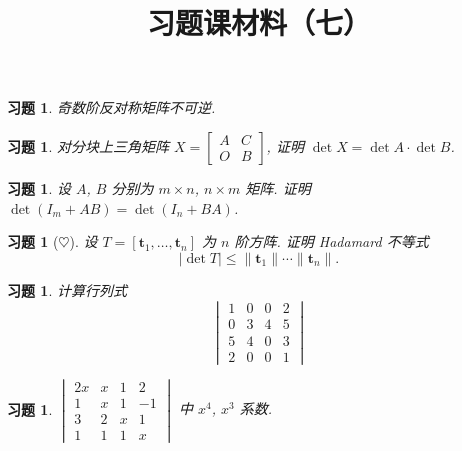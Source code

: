 \documentclass[UTF8]{ctexart}
\newtheorem{ex}[thm]{习题}
\begin{document}
\title{习题课材料（七）}
\date{}

\maketitle



\begin{ex}
  奇数阶反对称矩阵不可逆.
\end{ex}


\begin{ex}
  对分块上三角矩阵 \(X=\begin{bmatrix}A & C \\ O & B\end{bmatrix}\),
  证明 \(\det X = \det A \cdot \det B\).
\end{ex}


\begin{ex}
  设 \(A\), \(B\) 分别为 \(m\times n\), \(n\times m\) 矩阵.
  证明 \(\det(I_m + AB) = \det(I_n+BA)\).
\end{ex}

 

\begin{ex}[\(\heartsuit\)]
  设 \(T = [\boldsymbol{t}_1,\ldots,\boldsymbol{t}_n]\) 为 \(n\) 阶方阵.
  证明 Hadamard 不等式
  \[
    |\det T| \leq \|\boldsymbol{t}_1\| \cdots \|\boldsymbol{t}_n\|.
  \]
\end{ex}




\begin{ex}
  计算行列式
  \begin{equation*}
    \begin{vmatrix}
      1 & 0 & 0 & 2 \\
      0 & 3 & 4 & 5 \\
      5 & 4 & 0 & 3 \\
      2 & 0 & 0 & 1
    \end{vmatrix}
  \end{equation*}
\end{ex}



\begin{ex}
  \(\begin{vmatrix} 2x & x & 1 & 2 \\ 1 & x & 1 & -1\\ 3 & 2 & x & 1 \\ 1 & 1 & 1& x\end{vmatrix}\)
  中 \(x^4\), \(x^3\) 系数.
\end{ex}
\end{document}
